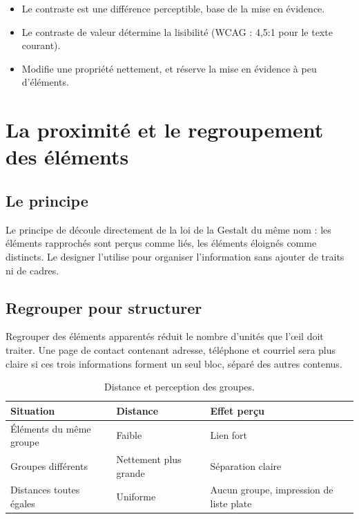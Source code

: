 \begin{retenir}
\begin{itemize}
  \item Le contraste est une différence perceptible, base de la mise en évidence.
  \item Le contraste de valeur détermine la lisibilité (WCAG : 4,5:1 pour le texte courant).
  \item Modifie une propriété nettement, et réserve la mise en évidence à peu d'éléments.
\end{itemize}
\end{retenir}

\section{La proximité et le regroupement des éléments}

\subsection{Le principe}

Le principe de  découle directement de la loi de la Gestalt du même nom : les éléments rapprochés sont perçus comme liés, les éléments éloignés comme distincts. Le designer l'utilise pour organiser l'information sans ajouter de traits ni de cadres.

\subsection{Regrouper pour structurer}

Regrouper des éléments apparentés réduit le nombre d'unités que l'œil doit traiter. Une page de contact contenant adresse, téléphone et courriel sera plus claire si ces trois informations forment un seul bloc, séparé des autres contenus.

\begin{table}[h!]
\centering
\begin{tabular}{@{}p{4.5cm}p{4.5cm}p{5cm}@{}}
\toprule
\textbf{Situation} & \textbf{Distance} & \textbf{Effet perçu} \\
\midrule
Éléments du même groupe & Faible & Lien fort \\
Groupes différents & Nettement plus grande & Séparation claire \\
Distances toutes égales & Uniforme & Aucun groupe, impression de liste plate \\
\bottomrule
\end{tabular}
\caption{Distance et perception des groupes.}
\end{table}

